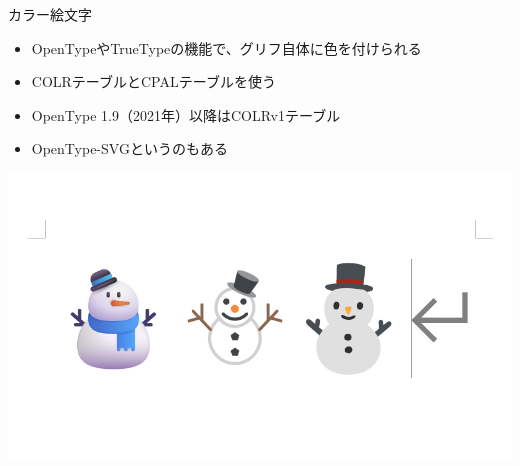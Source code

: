 \documentclass[unicode,14pt]{beamer}
\begin{document}
\begin{frame}[t]{カラー絵文字}
  \sffamily
  \begin{itemize}
\item OpenTypeやTrueTypeの機能で、グリフ自体に色を付けられる
\item COLRテーブルとCPALテーブルを使う
\item OpenType 1.9（2021年）以降はCOLRv1テーブル
\item OpenType-SVGというのもある
  \end{itemize}
  \begin{center}
    \includegraphics[width=.5\textwidth]{figures/emoji.png}
  \end{center}
\end{frame}
\end{document}
